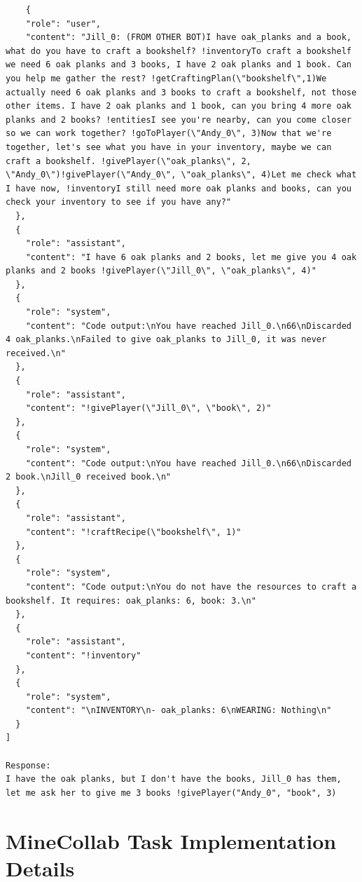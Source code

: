 \documentclass{article}
\begin{document}
\begin{lstlisting}
    {
    "role": "user",
    "content": "Jill_0: (FROM OTHER BOT)I have oak_planks and a book, what do you have to craft a bookshelf? !inventoryTo craft a bookshelf we need 6 oak planks and 3 books, I have 2 oak planks and 1 book. Can you help me gather the rest? !getCraftingPlan(\"bookshelf\",1)We actually need 6 oak planks and 3 books to craft a bookshelf, not those other items. I have 2 oak planks and 1 book, can you bring 4 more oak planks and 2 books? !entitiesI see you're nearby, can you come closer so we can work together? !goToPlayer(\"Andy_0\", 3)Now that we're together, let's see what you have in your inventory, maybe we can craft a bookshelf. !givePlayer(\"oak_planks\", 2, \"Andy_0\")!givePlayer(\"Andy_0\", \"oak_planks\", 4)Let me check what I have now, !inventoryI still need more oak planks and books, can you check your inventory to see if you have any?"
  },
  {
    "role": "assistant",
    "content": "I have 6 oak planks and 2 books, let me give you 4 oak planks and 2 books !givePlayer(\"Jill_0\", \"oak_planks\", 4)"
  },
  {
    "role": "system",
    "content": "Code output:\nYou have reached Jill_0.\n66\nDiscarded 4 oak_planks.\nFailed to give oak_planks to Jill_0, it was never received.\n"
  },
  {
    "role": "assistant",
    "content": "!givePlayer(\"Jill_0\", \"book\", 2)"
  },
  {
    "role": "system",
    "content": "Code output:\nYou have reached Jill_0.\n66\nDiscarded 2 book.\nJill_0 received book.\n"
  },
  {
    "role": "assistant",
    "content": "!craftRecipe(\"bookshelf\", 1)"
  },
  {
    "role": "system",
    "content": "Code output:\nYou do not have the resources to craft a bookshelf. It requires: oak_planks: 6, book: 3.\n"
  },
  {
    "role": "assistant",
    "content": "!inventory"
  },
  {
    "role": "system",
    "content": "\nINVENTORY\n- oak_planks: 6\nWEARING: Nothing\n"
  }
]

Response:
I have the oak planks, but I don't have the books, Jill_0 has them, let me ask her to give me 3 books !givePlayer("Andy_0", "book", 3)
\end{lstlisting}








\section{MineCollab Task Implementation Details}
\end{document}
